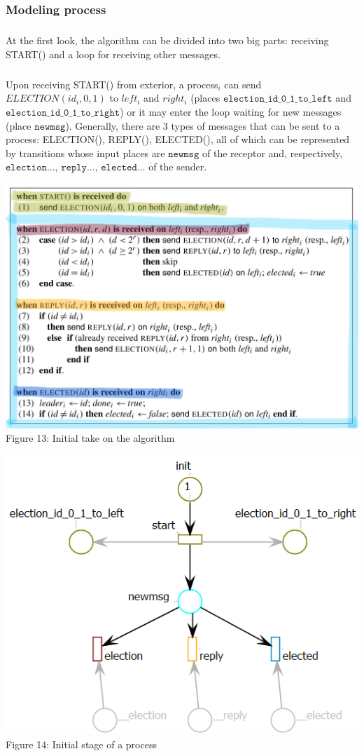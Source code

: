 \documentclass{article}
\begin{document}
	\subsubsection{Modeling process}
	\subparagraph{}At the first look, the algorithm can be divided into two big parts: receiving START() and a loop for receiving other messages. 
	\subparagraph{}Upon receiving START() from exterior, a process$_i$ can send $ELECTION(id_i,0,1)$ to $left_i$ and $right_i$ (places  $\mathtt{election\_id\_0\_1\_to\_left}$ and  $\mathtt{election\_id\_0\_1\_to\_right}$) or it may enter the loop waiting for new messages (place $\mathtt{newmsg}$). Generally, there are 3 types of messages that can be sent to a process: ELECTION(), REPLY(), ELECTED(), all of which can be represented by transitions whose input places are $\mathtt{newmsg}$ of the receptor and, respectively, $\mathtt{election...}$, $\mathtt{reply...}$, $\mathtt{elected...}$ of the sender.
	\begin{center}
		\centering
		\includegraphics[scale=0.17]{IMG_7684}
		\vspace*{5pt}
		\\Figure 13: Initial take on the algorithm
	\end{center}
	\begin{center}
		\centering
		\includegraphics[scale=0.7]{process_init_2}
		\vspace*{5pt}
		\\Figure 14: Initial stage of a process
	\end{center}
\end{document}
